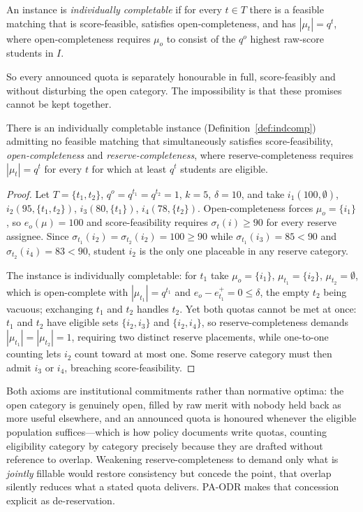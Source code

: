 \documentclass[runningheads]{llncs}
\begin{document}
\begin{definition}
\label{def:indcomp}
An instance is \emph{individually completable} if for every $t\in T$ there is a feasible matching that is score-feasible, satisfies open-completeness, and has $|\mu_t|=q^t$, where open-completeness requires $\mu_o$ to consist of the $q^o$ highest raw-score students in $I$.
\end{definition}

So every announced quota is separately honourable in full, score-feasibly and without disturbing the open category. The impossibility is that these promises cannot be kept together.

\begin{proposition}
\label{prop:impossibility}
There is an individually completable instance (Definition~\ref{def:indcomp}) admitting no feasible matching that simultaneously satisfies score-feasibility, \emph{open-completeness} and \emph{reserve-completeness}, where reserve-completeness requires $|\mu_t|=q^t$ for every $t$ for which at least $q^t$ students are eligible.
\end{proposition}

\begin{proof}
Let $T=\{t_1,t_2\}$, $q^o=q^{t_1}=q^{t_2}=1$, $k=5$, $\delta=10$, and take $i_1(100,\emptyset)$, $i_2(95,\{t_1,t_2\})$, $i_3(80,\{t_1\})$, $i_4(78,\{t_2\})$. Open-completeness forces $\mu_o=\{i_1\}$, so $e_o(\mu)=100$ and score-feasibility requires $\sigma_t(i)\ge90$ for every reserve assignee. Since $\sigma_{t_1}(i_2)=\sigma_{t_2}(i_2)=100\ge90$ while $\sigma_{t_1}(i_3)=85<90$ and $\sigma_{t_2}(i_4)=83<90$, student $i_2$ is the only one placeable in any reserve category.

The instance is individually completable: for $t_1$ take $\mu_o=\{i_1\}$, $\mu_{t_1}=\{i_2\}$, $\mu_{t_2}=\emptyset$, which is open-complete with $|\mu_{t_1}|=q^{t_1}$ and $e_o-e_{t_1}^+=0\le\delta$, the empty $t_2$ being vacuous; exchanging $t_1$ and $t_2$ handles $t_2$. Yet both quotas cannot be met at once: $t_1$ and $t_2$ have eligible sets $\{i_2,i_3\}$ and $\{i_2,i_4\}$, so reserve-completeness demands $|\mu_{t_1}|=|\mu_{t_2}|=1$, requiring two distinct reserve placements, while one-to-one counting lets $i_2$ count toward at most one. Some reserve category must then admit $i_3$ or $i_4$, breaching score-feasibility.
\end{proof}

Both axioms are institutional commitments rather than normative optima: the open category is genuinely open, filled by raw merit with nobody held back as more useful elsewhere, and an announced quota is honoured whenever the eligible population suffices---which is how policy documents write quotas, counting eligibility category by category precisely because they are drafted without reference to overlap. Weakening reserve-completeness to demand only what is \emph{jointly} fillable would restore consistency but concede the point, that overlap silently reduces what a stated quota delivers. PA-ODR makes that concession explicit as de-reservation.
\end{document}
